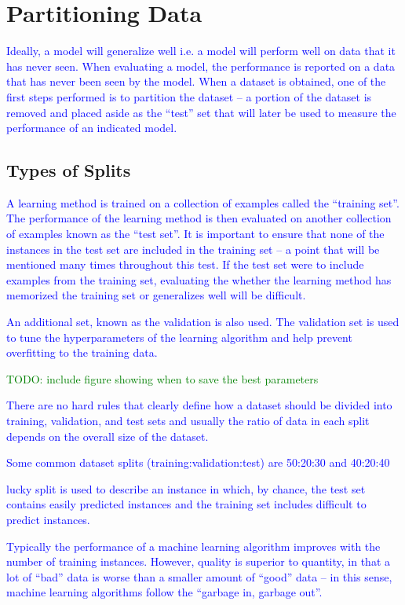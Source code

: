 \section{Partitioning Data}

\textcolor{blue}{Ideally, a model will generalize well i.e. a model will perform well on data that it has never seen. When evaluating a model, the performance is reported on a data that has never been seen by the model. When a dataset is obtained, one of the first steps performed is to partition the dataset -- a portion of the dataset is removed and placed aside as the ``test'' set that will later be used to measure the performance of an indicated model.}

\subsection{Types of Splits}

\textcolor{blue}{A learning method is trained on a collection of examples called the ``training set''. The performance of the learning method is then evaluated on another collection of examples known as the ``test set''. It is important to ensure that none of the instances in the test set are included in the training set -- a point that will be mentioned many times throughout this test. If the test set were to include examples from the training set, evaluating the whether the learning method has memorized the training set or generalizes well will be difficult.}

\textcolor{blue}{An additional set, known as the validation is also used. The validation set is used to tune the hyperparameters of the learning algorithm and help prevent overfitting to the training data.}

\textcolor{green}{TODO: include figure showing when to save the best parameters}

\textcolor{blue}{There are no hard rules that clearly define how a dataset should be divided into training, validation, and test sets and usually the ratio of data in each split depends on the overall size of the dataset.}

\textcolor{blue}{Some common dataset splits (training:validation:test) are 50:20:30 and 40:20:40}

\textcolor{blue}{{lucky split} is used to describe an instance in which, by chance, the test set contains easily predicted instances and the training set includes difficult to predict instances.}

\textcolor{blue}{Typically the performance of a machine learning algorithm improves with the number of training instances. However, quality is superior to quantity, in that a lot of ``bad'' data is worse than a smaller amount of ``good'' data -- in this sense, machine learning algorithms follow the ``garbage in, garbage out''.}

